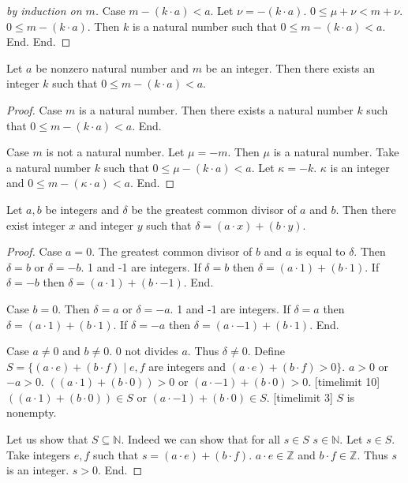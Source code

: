 \documentclass{article}
\begin{document}
\begin{forthel}
\begin{proof}[by induction on $m$]
Case $m - (k \cdot a) < a$. Let $\nu = -(k \cdot a)$.
$0 \leq \mu + \nu < m + \nu$.
$0 \leq m - (k \cdot a)$.
Then $k$ is a natural number such that
$0 \leq  m - (k \cdot a) < a$. End.
End.
\end{proof}

\begin{lemma}
Let $a$ be nonzero natural number and $m$ be an integer.
Then there exists an integer $k$ such that $0 \leq m - (k \cdot a) < a$.
\end{lemma}
\begin{proof}
Case $m$ is a natural number. Then there exists a natural number $k$ such that $0 \leq m - (k \cdot a) < a$. End.

Case $m$ is not a natural number. Let $\mu = -m$. Then $\mu$ is a natural number.
Take a natural number $k$ such that $0 \leq \mu - (k \cdot a) < a$. Let $\kappa = -k$.
$\kappa$ is an integer and $0 \leq m - (\kappa \cdot a) < a$. End.
\end{proof}



\begin{theorem}[Bezout]
Let $a,b$ be integers and $\delta$ be the greatest common divisor of $a$ and $b$.
Then there exist integer $x$ and integer $y$ such that
$\delta = (a \cdot x) + (b \cdot y)$.
\end{theorem}
\begin{proof}
Case $a = 0$. The greatest common divisor of $b$ and $a$ is equal to $\delta$.
  Then $\delta = b$ or $\delta = -b$. 1 and -1 are integers.
  If $\delta = b$ then $\delta = (a \cdot 1) + (b \cdot 1)$. If $\delta = -b$ then $\delta = (a \cdot 1) + (b \cdot -1)$. End.

Case $b = 0$. Then $\delta = a$ or $\delta = -a$. 1 and -1 are integers.
  If $\delta = a$ then $\delta = (a \cdot 1) + (b \cdot 1)$. If $\delta = -a$ then $\delta = (a \cdot -1) + (b \cdot 1)$. End.

Case $a \neq  0$ and $b \neq 0$.
  $0$ not divides $a$. Thus $\delta \neq 0$.
  Define $S = \{ (a \cdot e) + (b \cdot f) \mid e,f$ are integers and
  $(a \cdot e) + (b \cdot f) > 0\}$.
  $a > 0$ or $-a > 0$.
  $((a \cdot 1) + (b \cdot 0)) > 0$ or $(a \cdot -1) + (b \cdot 0) > 0$.
  [timelimit 10] $((a \cdot 1) + (b \cdot 0)) \in S$ or $(a \cdot -1) + (b \cdot 0) \in S$. [timelimit 3]
  $S$ is nonempty.

  Let us show that $S \subseteq \mathbb{N}$.
    Indeed we can show that for all $s \in S$ $s \in \mathbb{N}$.
    Let $s \in S$.
    Take integers $e,f$ such that $s = (a \cdot e) + (b \cdot f)$.
    $a \cdot e \in \mathbb{Z}$ and $b \cdot f \in \mathbb{Z}$. Thus $s$ is an integer.
    $s > 0$.
  End.



\end{proof}
\end{forthel}
\end{document}
